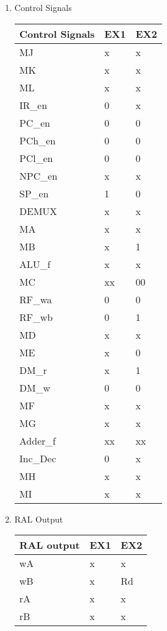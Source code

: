 \documentclass[12pt,letterpaper]{article}
\begin{document}
\begin{enumerate}
\begin{enumerate}
        \item Control Signals\\
            \begin{tabular}{l l l}
                 Control Signals & EX1 & EX2 \\
                 \hline
                 MJ & x & x \\
                 MK & x & x \\
                 ML & x & x \\
                 IR\_en & 0 & x \\
                 PC\_en & 0 & 0 \\
                 PCh\_en & 0 & 0 \\
                 PCl\_en & 0 & 0 \\
                 NPC\_en & x & x \\
                 SP\_en & 1 & 0 \\
                 DEMUX & x & x \\
                 MA & x & x \\
                 MB & x & 1 \\
                 ALU\_f & x & x \\
                 MC & xx & 00 \\
                 RF\_wa & 0 & 0 \\
                 RF\_wb & 0 & 1 \\
                 MD & x & x \\
                 ME & x & 0 \\
                 DM\_r & x & 1 \\
                 DM\_w & 0 & 0 \\
                 MF & x & x \\
                 MG & x & x \\
                 Adder\_f & xx & xx \\
                 Inc\_Dec & 0 & x \\
                 MH & x & x \\
                 MI & x & x \\
            \end{tabular}

        \item RAL Output\\
            \begin{tabular}{l l l}
                 RAL output & EX1 & EX2 \\
                 \hline
                 wA & x & x \\
                 wB & x & Rd \\
                 rA & x & x \\
                 rB & x & x \\
            \end{tabular}
        \end{enumerate}





\end{enumerate}
\end{document}
